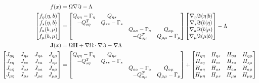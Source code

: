 \documentclass[a4paper, titlepage]{jsarticle}
\begin{document}
\begin{equation}
    \begin{aligned}
        f(x) &= \Omega\nabla\imaginary - \Lambda \\
        \begin{bmatrix}
            f_{\eta}(\eta, b) \\
            f_{s}(\eta, b) \\
            f_{a}(b, \mu) \\
            f_{\mu}(b, \mu)
        \end{bmatrix}
        &=\begin{bmatrix}
            Q_{\eta\eta} - \Gamma_{\eta} & Q_{\eta s} & & \\
            -Q_{s\eta}^T & Q_{ss} - \Gamma_{s} & & \\
             & & Q_{aa} - \Gamma_{a} & Q_{a\mu} \\
             & & -Q_{a\mu}^T & Q_{\mu\mu} - \Gamma_{\mu}
        \end{bmatrix}
        \begin{bmatrix}
            \nabla_{\eta}\imaginary(\eta | b) \\
            \nabla_{s}\imaginary(b | \eta) \\
            \nabla_{a}\imaginary(b|\mu) \\
            \nabla_{\mu}\imaginary(\mu | b)
        \end{bmatrix}
        - \Lambda \\
        \mathbf{J}(x) &= \Omega\mathbf{H} + \nabla\Omega \cdot \nabla\imaginary - \nabla \Lambda \\
        \begin{bmatrix}
            J_{\eta\eta} & J_{\eta s} & J_{\eta a} & J_{\eta\mu} \\
            J_{s\eta} & J_{ss} & J_{sa} & J_{s\mu} \\
            J_{a\eta} & J_{as} & J_{aa} & J_{a\mu} \\
            J_{\mu\eta} & J_{\mu s} & J_{\mu a} & J_{\mu\mu}
        \end{bmatrix}
        &= \begin{bmatrix}
            Q_{\eta\eta} - \Gamma_{\eta} & Q_{\eta s} \\
            -Q_{s\eta}^T & Q_{ss} - \Gamma_{s} \\
             & & Q_{aa} - \Gamma_{a} & Q_{a\mu} \\
             & & -Q_{a\mu}^T & Q_{\mu\mu} - \Gamma_{\mu}
        \end{bmatrix}
         + \begin{bmatrix}
            H_{\eta\eta} & H_{\eta s} & H_{\eta a} & H_{\eta\mu} \\
            H_{s\eta} & H_{ss} & H_{sa} & H_{s\mu} \\
            H_{a\eta} & H_{as} & H_{aa} & H_{a\mu} \\
            H_{\mu\eta} & H_{\mu s} & H_{\mu a} & H_{\mu\mu}
        \end{bmatrix}
    \end{aligned}
\end{equation}
\end{document}
